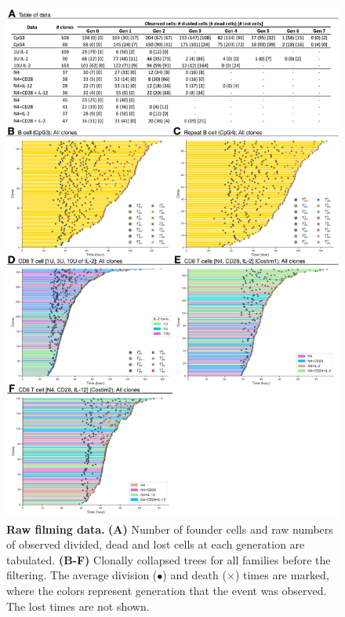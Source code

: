 \documentclass[11pt, a4paper]{article}
\begin{document}
\begin{figure}[H]
    \centering
    \includegraphics[scale=0.46]{figs/supp_fig1.pdf}
    \caption{\textbf{Raw filming data.} \textbf{(A)} Number of founder cells and raw numbers of observed divided, dead and lost cells at each generation are tabulated. \textbf{(B-F)} Clonally collapsed trees for all families before the filtering. The average division ($\bullet$) and death ($\times$) times are marked, where the colors represent generation that the event was observed. The lost times are not shown.}
    \label{supp_fig:raw_data}
\end{figure}
\end{document}
